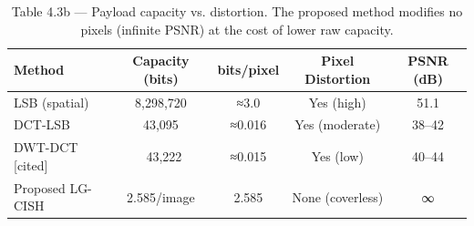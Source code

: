 \begin{table}[htbp]
\centering
\caption{Table 4.3b — Payload capacity vs. distortion. The proposed method modifies no pixels (infinite PSNR) at the cost of lower raw capacity.}
\label{tab:table_4_3_capacity}
\begin{tabular}{lcccc}
\hline
Method & Capacity (bits) & bits/pixel & Pixel Distortion & PSNR (dB) \\
\hline
LSB (spatial) & 8,298,720 & ≈3.0 & Yes (high) & 51.1 \\
DCT-LSB & 43,095 & ≈0.016 & Yes (moderate) & 38–42 \\
DWT-DCT [cited] & ~43,222 & ≈0.015 & Yes (low) & 40–44 \\
Proposed LG-CISH & 2.585/image & 2.585 & None (coverless) & ∞ \\
\hline
\end{tabular}
\end{table}
